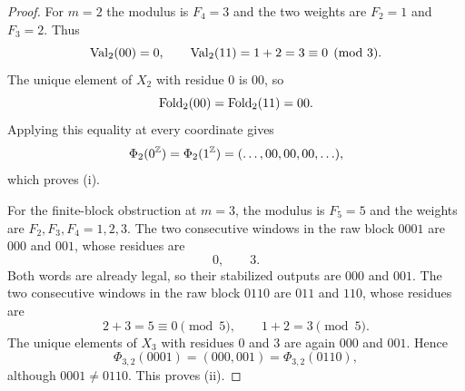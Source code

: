 \begin{proof}
For $m=2$ the modulus is $F_4=3$ and the two weights are
$F_2=1$ and $F_3=2$.  Thus
\[
\mathrm{Val}_2(00)=0,\qquad \mathrm{Val}_2(11)=1+2=3\equiv0\pmod 3.
\]
The unique element of $X_2$ with residue $0$ is $00$, so
\[
\mathrm{Fold}_2(00)=\mathrm{Fold}_2(11)=00.
\]
Applying this equality at every coordinate gives
\[
\Phi_2(0^{\mathbb{Z}})=\Phi_2(1^{\mathbb{Z}})=(\ldots,00,00,00,\ldots),
\]
which proves (i).

For the finite-block obstruction at $m=3$, the modulus is $F_5=5$ and the
weights are $F_2,F_3,F_4=1,2,3$.  The two consecutive windows in the raw block
$0001$ are $000$ and $001$, whose residues are
\[
0,\qquad 3.
\]
Both words are already legal, so their stabilized outputs are $000$ and
$001$.  The two consecutive windows in the raw block $0110$ are $011$ and
$110$, whose residues are
\[
2+3=5\equiv0\pmod5,\qquad 1+2=3\pmod5.
\]
The unique elements of $X_3$ with residues $0$ and $3$ are again $000$ and
$001$.  Hence
\[
\Phi_{3,2}(0001)=(000,001)=\Phi_{3,2}(0110),
\]
although $0001\ne0110$.  This proves (ii).
\end{proof}
